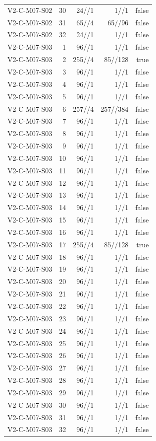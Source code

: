 {\begin{longtable}{lrrrr}
V2-C-M07-S02 & 30 & 24//1 & 1//1 & false \\
V2-C-M07-S02 & 31 & 65//4 & 65//96 & false \\
V2-C-M07-S02 & 32 & 24//1 & 1//1 & false \\
V2-C-M07-S03 & 1 & 96//1 & 1//1 & false \\
V2-C-M07-S03 & 2 & 255//4 & 85//128 & true \\
V2-C-M07-S03 & 3 & 96//1 & 1//1 & false \\
V2-C-M07-S03 & 4 & 96//1 & 1//1 & false \\
V2-C-M07-S03 & 5 & 96//1 & 1//1 & false \\
V2-C-M07-S03 & 6 & 257//4 & 257//384 & false \\
V2-C-M07-S03 & 7 & 96//1 & 1//1 & false \\
V2-C-M07-S03 & 8 & 96//1 & 1//1 & false \\
V2-C-M07-S03 & 9 & 96//1 & 1//1 & false \\
V2-C-M07-S03 & 10 & 96//1 & 1//1 & false \\
V2-C-M07-S03 & 11 & 96//1 & 1//1 & false \\
V2-C-M07-S03 & 12 & 96//1 & 1//1 & false \\
V2-C-M07-S03 & 13 & 96//1 & 1//1 & false \\
V2-C-M07-S03 & 14 & 96//1 & 1//1 & false \\
V2-C-M07-S03 & 15 & 96//1 & 1//1 & false \\
V2-C-M07-S03 & 16 & 96//1 & 1//1 & false \\
V2-C-M07-S03 & 17 & 255//4 & 85//128 & true \\
V2-C-M07-S03 & 18 & 96//1 & 1//1 & false \\
V2-C-M07-S03 & 19 & 96//1 & 1//1 & false \\
V2-C-M07-S03 & 20 & 96//1 & 1//1 & false \\
V2-C-M07-S03 & 21 & 96//1 & 1//1 & false \\
V2-C-M07-S03 & 22 & 96//1 & 1//1 & false \\
V2-C-M07-S03 & 23 & 96//1 & 1//1 & false \\
V2-C-M07-S03 & 24 & 96//1 & 1//1 & false \\
V2-C-M07-S03 & 25 & 96//1 & 1//1 & false \\
V2-C-M07-S03 & 26 & 96//1 & 1//1 & false \\
V2-C-M07-S03 & 27 & 96//1 & 1//1 & false \\
V2-C-M07-S03 & 28 & 96//1 & 1//1 & false \\
V2-C-M07-S03 & 29 & 96//1 & 1//1 & false \\
V2-C-M07-S03 & 30 & 96//1 & 1//1 & false \\
V2-C-M07-S03 & 31 & 96//1 & 1//1 & false \\
V2-C-M07-S03 & 32 & 96//1 & 1//1 & false \\
\bottomrule
\end{longtable}
}
